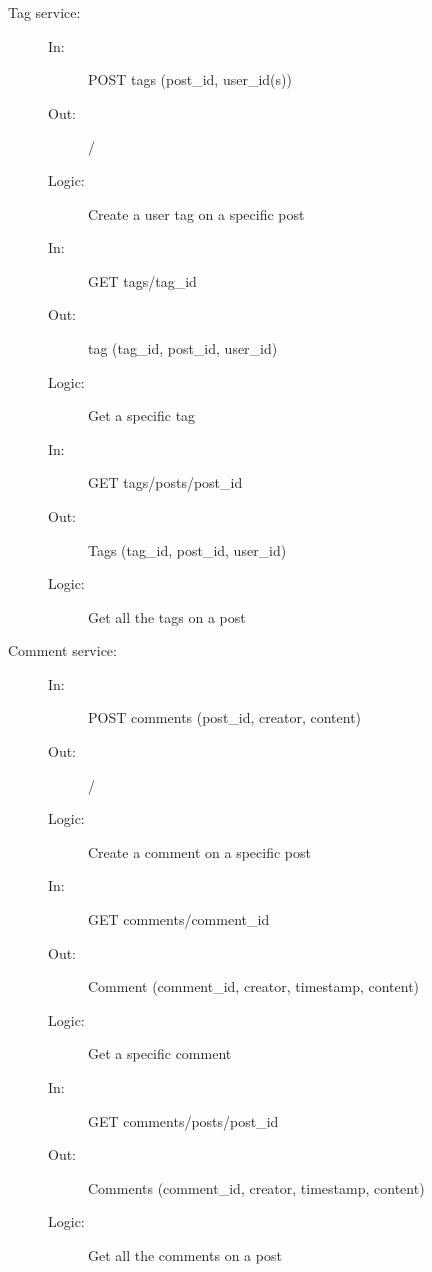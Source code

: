 \documentclass{article}
\begin{document}
\begin{description}
    \item [Tag service:] 
    \begin{description}
        \item[]
        \item[In:] POST tags (post\_id, user\_id(s))
        \item[Out:] /
        \item[Logic:] Create a user tag on a specific post
        \item[]
        
        \item[In:] GET tags/tag\_id
        \item[Out:] tag (tag\_id, post\_id, user\_id)
        \item[Logic:] Get a specific tag
        \item[]

        \item[In:] GET tags/posts/post\_id
        \item[Out:] Tags (tag\_id, post\_id, user\_id)
        \item[Logic:] Get all the tags on a post
        \item[]
    \end{description}
\end{description}

\begin{description}
    \item [Comment service:] 
    \begin{description}
        \item[]
        \item[In:] POST comments (post\_id, creator, content)
        \item[Out:] /
        \item[Logic:] Create a comment on a specific post
        \item[]
        
        \item[In:] GET comments/comment\_id
        \item[Out:] Comment (comment\_id, creator, timestamp, content)
        \item[Logic:] Get a specific comment
        \item[]

        \item[In:] GET comments/posts/post\_id
        \item[Out:] Comments (comment\_id, creator, timestamp, content)
        \item[Logic:] Get all the comments on a post
        \item[]
    \end{description}
\end{description}
\end{document}
